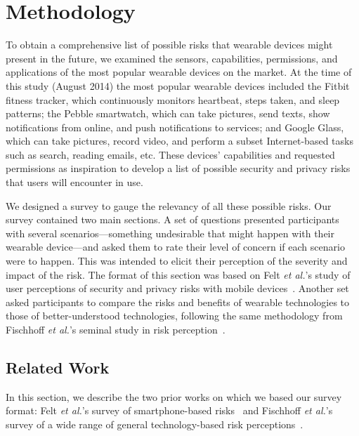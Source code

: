 
\section{Methodology}
To obtain a comprehensive list of possible risks that wearable devices might present in the future, we examined the sensors, capabilities, permissions, and applications of the most popular wearable devices on the market. At the time of this study (August 2014) the most popular wearable devices included the Fitbit fitness tracker, which continuously monitors heartbeat, steps taken, and sleep patterns;
the Pebble smartwatch, which can take pictures, send texts, show notifications from online, and push notifications to services; %
and Google Glass, which can take pictures, record video, and perform a subset Internet-based tasks such as search, reading emails, etc. %
These devices' capabilities and requested permissions as inspiration to develop a list of possible security and privacy risks that users will encounter in use.

We designed a survey to gauge the relevancy of all these possible risks.
Our survey contained two main sections. A set of questions presented participants with several scenarios---something undesirable that might happen with their wearable device---and asked them to rate their level of concern if each scenario were to happen. This was intended to elicit their perception of the severity and impact of the risk.
The format of this section was based on Felt {\it et al.}'s study of user perceptions of security and privacy risks with mobile devices~\cite{Felt}. Another set asked participants to compare the risks and benefits of wearable technologies to those of better-understood technologies, following the same methodology from Fischhoff {\it et al.}'s seminal study in risk perception~\cite{Fischhoff}.

\subsection{Related Work}
In this section, we describe the two prior works on which we based our survey format: Felt {\it et al.}'s survey of smartphone-based risks~\cite{Felt} and Fischhoff {\it et al.}'s survey of a wide range of general technology-based risk perceptions~\cite{Fischhoff}.

